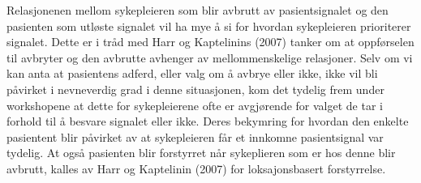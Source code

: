 \noindent
Relasjonenen mellom sykepleieren som blir avbrutt av pasientsignalet og den pasienten som utløste signalet vil ha mye å si for hvordan sykepleieren prioriterer signalet. Dette er i tråd med Harr og Kaptelinins (2007) tanker om at oppførselen til avbryter og den avbrutte avhenger av mellommenskelige relasjoner. Selv om vi kan anta at pasientens adferd, eller valg om å avbrye eller ikke, ikke vil bli påvirket i nevneverdig grad i denne situasjonen, kom det tydelig frem under workshopene at dette for sykepleierene ofte er avgjørende for valget de tar i forhold til å besvare signalet eller ikke. 
Deres bekymring for hvordan den enkelte pasientent blir påvirket av at sykepleieren får et innkomne pasientsignal var tydelig. At også pasienten blir forstyrret når sykeplieren som er hos denne blir avbrutt, kalles av Harr og Kaptelinin (2007) for loksajonsbasert forstyrrelse. 

